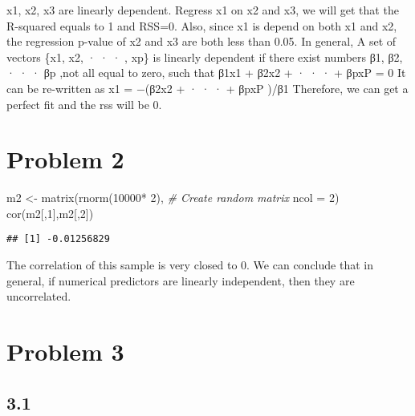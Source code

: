 \documentclass[
  11pt,
]{article}
\newenvironment{Shaded}{\begin{snugshade}}{\end{snugshade}}
\newcommand{\AttributeTok}[1]{\textcolor[rgb]{0.77,0.63,0.00}{#1}}
\newcommand{\CommentTok}[1]{\textcolor[rgb]{0.56,0.35,0.01}{\textit{#1}}}
\newcommand{\DecValTok}[1]{\textcolor[rgb]{0.00,0.00,0.81}{#1}}
\newcommand{\FunctionTok}[1]{\textcolor[rgb]{0.00,0.00,0.00}{#1}}
\newcommand{\NormalTok}[1]{#1}
\newcommand{\OtherTok}[1]{\textcolor[rgb]{0.56,0.35,0.01}{#1}}
\newcommand{\SpecialCharTok}[1]{\textcolor[rgb]{0.00,0.00,0.00}{#1}}
\begin{document}
x1, x2, x3 are linearly dependent. Regress x1 on x2 and x3, we will get
that the R-squared equals to 1 and RSS=0. Also, since x1 is depend on
both x1 and x2, the regression p-value of x2 and x3 are both less than
0.05. In general, A set of vectors \{x1, x2, · · · , xp\} is linearly
dependent if there exist numbers β1, β2, · · · βp ,not all equal to
zero, such that β1x1 + β2x2 + · · · + βpxP = 0 It can be re-written as
x1 = −(β2x2 + · · · + βpxP )/β1 Therefore, we can get a perfect fit and
the rss will be 0.

\hypertarget{problem-2}{%
\section{Problem 2}\label{problem-2}}

\begin{Shaded}
\begin{Highlighting}[]
\NormalTok{m2 }\OtherTok{\textless{}{-}} \FunctionTok{matrix}\NormalTok{(}\FunctionTok{rnorm}\NormalTok{(}\DecValTok{10000}\SpecialCharTok{*} \DecValTok{2}\NormalTok{), }\CommentTok{\# Create random matrix}
\AttributeTok{ncol =} \DecValTok{2}\NormalTok{)}
\FunctionTok{cor}\NormalTok{(m2[,}\DecValTok{1}\NormalTok{],m2[,}\DecValTok{2}\NormalTok{])}
\end{Highlighting}
\end{Shaded}

\begin{verbatim}
## [1] -0.01256829
\end{verbatim}

The correlation of this sample is very closed to 0. We can conclude that
in general, if numerical predictors are linearly independent, then they
are uncorrelated.

\hypertarget{problem-3}{%
\section{Problem 3}\label{problem-3}}

\hypertarget{section}{%
\subsection{3.1}\label{section}}
\end{document}
